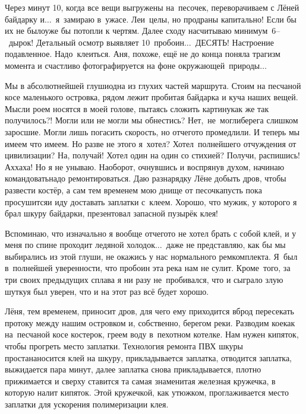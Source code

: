 Через минут 10, когда все вещи выгружены на~песочек, переворачиваем с Лёней байдарку и$\ldots$~я~замираю в~ужасе. Леи~целы, но продраны капитально! Если бы их не было\mdash уже бы потопли к чертям. Далее сходу насчитываю минимум~6\thinspace--~дырок! Детальный осмотр выявляет 10~пробоин$\ldots$~ДЕСЯТЬ! Настроение подавленное. Надо~клеиться. Аня, похоже, ещё не до конца поняла трагизм момента и счастливо фотографируется на фоне окружающей~природы$\ldots$

Мы в абсолютнейшей глуши\mdash одна из глухих частей маршрута. Стоим на песчаной косе маленького островка, рядом лежит пробитая байдарка и куча наших вещей. Мысли роем носятся в моей голове, пытаясь сложить картину\mdash как же так получилось?! Могли или не могли мы обнестись? Нет,~не~могли\mdash берега слишком заросшие. Могли лишь погасить скорость, но отчего\sdash то промедлили. И теперь мы имеем что имеем. Но разве не этого я~хотел? Хотел~полнейшего отчуждения от цивилизации? На, получай! Хотел один на один со стихией? Получи, распишись! Ах\sdash ха\sdash ха! Но я не унываю. Наоборот, очнувшись и воспрянув духом, начинаю командовать\mdash надо ремонтироваться. 
\newpage
Даю разнарядку Лёне добыть дров, чтобы развести костёр, а сам тем временем мою днище от песочка\mdash пусть пока просушится\mdash и иду доставать заплатки с~клеем. Хорошо, что мужик, у которого я брал шкуру байдарки, презентовал запасной пузырёк клея! 

Вспоминаю, что изначально я вообще отчего\sdash то не хотел брать с собой клей, и у меня по спине проходит ледяной холодок$\ldots$~даже не представляю, как бы мы выбирались из этой глуши, не окажись у нас нормального ремкомплекта. Я~был в~полнейшей уверенности, что пробоин эта река нам не сулит. Кроме~того, за три своих предыдущих сплава я ни разу не~пробивался, что и сыграло злую шутку\mdash я был уверен, что и на этот раз всё будет хорошо. 

Лёня, тем временем, приносит дров, для чего ему приходится вброд пересекать протоку между нашим островком и, собственно, берегом реки. Разводим кое\sdash как на~песчаной косе костерок, греем воду в~пехотном котелке. Нам нужен кипяток, чтобы прогреть место заплатки. Технология ремонта ПВХ шкуры проста\mdash наносится клей на шкуру, прикладывается заплатка, отводится заплатка, выжидается пара минут, далее заплатка снова прикладывается, плотно прижимается и сверху ставится та самая знаменитая железная кружечка, в которую налит кипяток. Этой кружечкой, как утюжком, проглаживается место заплатки для ускорения полимеризации клея. 

